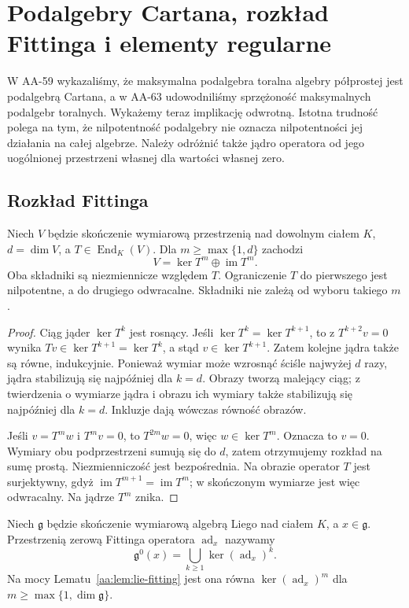 \chapter[Podalgebry Cartana i rozkład Fittinga]{Podalgebry Cartana, rozkład Fittinga i elementy regularne}
\label{aa:ch:cartan-fitting}

W AA-59 wykazaliśmy, że maksymalna podalgebra toralna algebry półprostej jest podalgebrą Cartana, a w AA-63 udowodniliśmy sprzężoność maksymalnych podalgebr toralnych. Wykażemy teraz implikację odwrotną. Istotna trudność polega na tym, że nilpotentność podalgebry nie oznacza nilpotentności jej działania na całej algebrze. Należy odróżnić także jądro operatora od jego uogólnionej przestrzeni własnej dla wartości własnej zero.

\section{Rozkład Fittinga}

\begin{lemat}
\label{aa:lem:lie-fitting}
Niech $V$ będzie skończenie wymiarową przestrzenią nad dowolnym ciałem $K$, $d=\dim V$, a $T\in\operatorname{End}_K(V)$. Dla $m\ge\max\{1,d\}$ zachodzi
\[
 V=\ker T^m\oplus\operatorname{im}T^m.
\]
Oba składniki są niezmiennicze względem $T$. Ograniczenie $T$ do pierwszego jest nilpotentne, a do drugiego odwracalne. Składniki nie zależą od wyboru takiego $m$.
\end{lemat}
\begin{proof}
Ciąg jąder $\ker T^k$ jest rosnący. Jeśli $\ker T^k=\ker T^{k+1}$, to z $T^{k+2}v=0$ wynika $Tv\in\ker T^{k+1}=\ker T^k$, a stąd $v\in\ker T^{k+1}$. Zatem kolejne jądra także są równe, indukcyjnie. Ponieważ wymiar może wzrosnąć ściśle najwyżej $d$ razy, jądra stabilizują się najpóźniej dla $k=d$. Obrazy tworzą malejący ciąg; z twierdzenia o wymiarze jądra i obrazu ich wymiary także stabilizują się najpóźniej dla $k=d$. Inkluzje dają wówczas równość obrazów.

Jeśli $v=T^mw$ i $T^mv=0$, to $T^{2m}w=0$, więc $w\in\ker T^m$. Oznacza to $v=0$. Wymiary obu podprzestrzeni sumują się do $d$, zatem otrzymujemy rozkład na sumę prostą. Niezmienniczość jest bezpośrednia. Na obrazie operator $T$ jest surjektywny, gdyż $\operatorname{im}T^{m+1}=\operatorname{im}T^m$; w skończonym wymiarze jest więc odwracalny. Na jądrze $T^m$ znika.
\end{proof}

\begin{definicja}
\label{aa:def:lie-fitting-null}
Niech $\mathfrak g$ będzie skończenie wymiarową algebrą Liego nad ciałem $K$, a $x\in\mathfrak g$. Przestrzenią zerową Fittinga operatora $\operatorname{ad}_x$ nazywamy
\[
 \mathfrak g^0(x)=\bigcup_{k\ge1}\ker(\operatorname{ad}_x)^k.
\]
Na mocy Lematu~\ref{aa:lem:lie-fitting} jest ona równa $\ker(\operatorname{ad}_x)^m$ dla $m\ge\max\{1,\dim\mathfrak g\}$.
\end{definicja}

